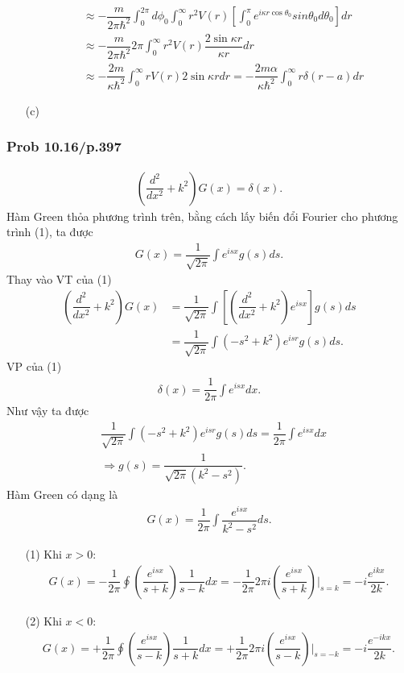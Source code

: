 \documentclass{report}
\newcommand{\f}[2]{\dfrac{#1}{#2}}
\newcommand{\at}[2]{\bigg\rvert_{#1}^{#2} }
\begin{document}
\begin{enumerate}
\begin{align*}
		       & \approx -\f{m}{2\pi \hbar^2} \int_{0}^{2\pi}d\phi_{0} \int_{0}^{\infty} r^{2} V(r) \left[\int_{0}^{\pi} e^{i\kappa r \cos\theta_{0}}sin\theta_{0} d\theta_{0}\right] dr \\
		       & \approx -\f{m}{2\pi \hbar^2} 2\pi \int_{0}^{\infty} r^{2} V(r) \f{2\sin \kappa r}{\kappa r} dr                                                                          \\
		       & \approx -\f{2m}{\kappa\hbar^2} \int_{0}^{\infty} r V(r) 2\sin \kappa r dr = -\f{2m\alpha}{\kappa\hbar^2} \int_{0}^{\infty} r \delta(r-a) dr
	      \end{align*}
	\item [(c)]
\end{enumerate}

\subsubsection{Prob 10.16/p.397}
\begin{align*}
	\left( \f{d^2}{dx^2} + k^2 \right) G(x) = \delta(x).\tag{1}
\end{align*}
Hàm Green thỏa phương trình trên, bằng cách lấy biến đổi Fourier cho phương trình (1), ta được
\begin{align*}
	G(x) = \f{1}{\sqrt{2\pi}}\int e^{isx}g(s)ds.
\end{align*}
Thay vào VT của (1)
\begin{align*}
	\left( \f{d^2}{dx^2} + k^2 \right) G(x) 
	&= \f{1}{\sqrt{2\pi}}\int \left[\left( \f{d^2}{dx^2} + k^2 \right)e^{isx}\right]g(s)ds \\
	&= \f{1}{\sqrt{2\pi}} \int \left(-s^2 + k^2\right) e^{isr} g(s) ds.
\end{align*}
VP của (1) 
\begin{align*}
	\delta(x) = \f{1}{2\pi} \int e^{isx} dx.
\end{align*}
Như vậy ta được
\begin{align*}
	&\f{1}{\sqrt{2\pi}} \int \left(-s^2 + k^2\right) e^{isr} g(s) ds = \f{1}{2\pi}  \int e^{isx} dx \\
	&\Rightarrow g(s) = \f{1}{\sqrt{2\pi} (k^2 - s^2)}.
\end{align*}
Hàm Green có dạng là 
\begin{align*}
	G(x) = \f{1}{2\pi} \int \f{e^{isx}}{k^2 - s^2} ds.
\end{align*}
\begin{enumerate}
	\item[(1)]
	Khi $x>0$:
	\begin{align*}
		G(x) = -\f{1}{2\pi}\oint \left( \f{e^{isx}}{s+k} \right)\f{1}{s-k} dx = -\f{1}{2\pi} 2\pi i \left( \f{e^{isx}}{s+k} \right) \at{s=k}{} = -i\f{e^{ikx}}{2k}.
	\end{align*} 
	\item[(2)]
	Khi $x<0$:
	\begin{align*}
		G(x) = +\f{1}{2\pi}\oint \left( \f{e^{isx}}{s-k} \right)\f{1}{s+k} dx = +\f{1}{2\pi} 2\pi i \left( \f{e^{isx}}{s-k} \right) \at{s=-k}{} = -i\f{e^{-ikx}}{2k}.
	\end{align*} 
\end{enumerate}
\end{document}
